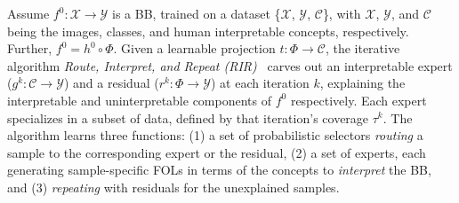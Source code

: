 Assume $f^0: \mathcal{X} \rightarrow \mathcal{Y}$ is a BB, trained on a dataset \{$\mathcal{X}$, $\mathcal{Y}$, $\mathcal{C}$\}, with $\mathcal{X}$, $\mathcal{Y}$, and $\mathcal{C}$ being the images, classes, and human interpretable concepts, respectively. Further, $f^0=h^0 \circ \Phi$. Given a learnable projection $t: \Phi \rightarrow \mathcal{C}$, the iterative algorithm \emph{Route, Interpret, and Repeat (RIR)}~\cite{ghosh2023route} carves out an interpretable expert ($g^k: \mathcal{C} \rightarrow \mathcal{Y}$) and a residual ($r^k :\Phi\rightarrow\mathcal{Y}$) at each iteration $k$, explaining the interpretable and uninterpretable components of $f^0$ respectively. Each expert specializes in a subset of data, defined by that iteration's coverage $\tau^k$. 
The algorithm learns three functions: (1) a set of probabilistic selectors \emph{routing} a sample to the corresponding expert or the residual, (2) a set of experts, each generating sample-specific FOLs in terms of the concepts to \emph{interpret} the BB, and (3) \emph{repeating} with residuals for the unexplained samples.


